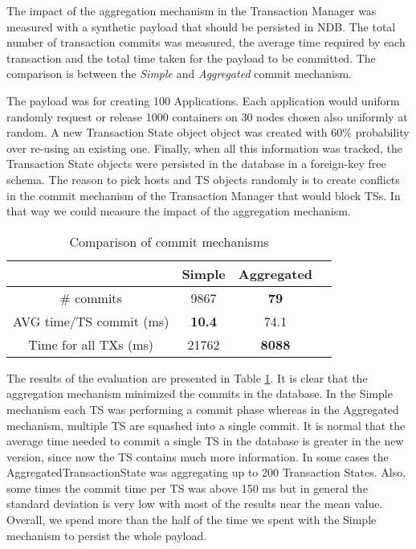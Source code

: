 The impact of the aggregation mechanism in the Transaction Manager was
measured with a synthetic payload that should be persisted in
NDB. The total number of transaction commits was measured,
the average time required by each transaction and the
total time taken for the payload to be committed. The comparison is
between the \emph{Simple} and \emph{Aggregated} commit mechanism.

The payload was for creating 100 Applications. Each application would
uniform randomly request or release 1000 containers on 30 nodes
chosen also uniformly at random. A new Transaction State object object
was created with 60$\%$ probability over re-using an existing
one. Finally, when all this information was tracked, the Transaction
State objects were persisted in the database in a foreign-key free
schema. The reason to pick hosts
and TS objects randomly is to create conflicts in the commit mechanism
of the Transaction Manager that would block TSs. In that way we could
measure the impact of the aggregation mechanism.

\begin{table}
\centering
\begin{tabular}{| c | c | c | c |}
\hline
  & Simple & Aggregated \\
\hline
\# commits & 9867 & \textbf{79} \\
\hline
AVG time/TS commit (ms) & \textbf{10.4} & 74.1 \\
\hline
Time for all TXs (ms) & 21762 & \textbf{8088} \\
\hline
\end{tabular}
\caption{Comparison of commit mechanisms}
\label{tab:ev_commit_mechanism}
\end{table}

The results of the evaluation are presented in Table
\ref{tab:ev_commit_mechanism}. It is clear that the aggregation
mechanism minimized the commits in the database. In the Simple mechanism
each TS was performing a commit phase whereas in the Aggregated mechanism,
multiple TS are squashed into a single commit. It is normal that the
average time needed to commit a single TS in the database is greater
in the new version, since now the TS contains much more
information. In some cases the AggregatedTransactionState was
aggregating up to 200 Transaction States. Also, some times the commit
time per TS was above 150 ms but in general the standard deviation is very low with
most of the results near the mean value. Overall, we spend more
than the half of the time we spent with the Simple mechanism to persist
the whole payload.